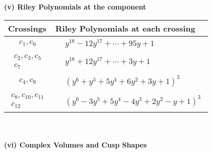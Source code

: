 \documentclass[1p]{elsarticle_modified}
\theoremstyle{definition}
\begin{document}
\newpage\renewcommand{\arraystretch}{1}
\flushleft \textbf{(v) Riley Polynomials at the component}\newline \\
\begin{tabular}{m{50pt}|m{274pt}}
Crossings & \hspace{64pt}Riley Polynomials at each crossing \\
\hline $$\begin{aligned}c_{1},c_{6}\end{aligned}$$&$\begin{aligned}
&y^{18}-12 y^{17}+\cdots+95 y+1
\end{aligned}$\\
\hline $$\begin{aligned}c_{2},c_{3},c_{5}\\c_{7}\end{aligned}$$&$\begin{aligned}
&y^{18}+12 y^{17}+\cdots+3 y+1
\end{aligned}$\\
\hline $$\begin{aligned}c_{4},c_{9}\end{aligned}$$&$\begin{aligned}
&(y^6+y^5+5 y^4+6 y^2+3 y+1)^3
\end{aligned}$\\
\hline $$\begin{aligned}c_{8},c_{10},c_{11}\\c_{12}\end{aligned}$$&$\begin{aligned}
&(y^6-3 y^5+5 y^4-4 y^3+2 y^2- y+1)^3
\end{aligned}$\\
\hline
\end{tabular}\\~\\
\newpage\flushleft \textbf{(vi) Complex Volumes and Cusp Shapes}
\end{document}
